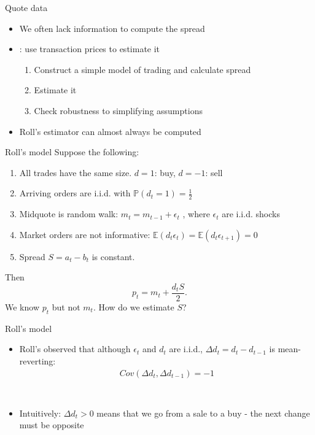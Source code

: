 \documentclass[english,10pt]{beamer}
\begin{document}
\begin{frame}{Quote data}
	\begin{itemize}
		\item We often lack information to compute the spread
		\item \citet{roll_simple_1984}: use transaction prices to estimate it
		\begin{enumerate}
			\item Construct a simple model of trading and calculate spread
			\item Estimate it
			\item Check robustness to simplifying assumptions
		\end{enumerate}
		\item Roll's estimator can almost always be computed
	\end{itemize}
\end{frame}


\begin{frame}{Roll's model}
	Suppose the following:
	\begin{enumerate}
		\item All trades have the same size. $d=1$: buy, $d=-1$: sell
		\item Arriving orders are i.i.d. with $\mathbb{P}(d_t =1)=\frac{1}{2}$
		\item Midquote is random walk: $m_t = m_{t-1} + \epsilon_t$  , where $\epsilon_t$ are i.i.d. shocks
		\item Market orders are not informative: $\mathbb{E}(d_t \epsilon_t)=\mathbb{E}(d_t \epsilon_{t+1})=0$
		\item Spread $S = a_t-b_t$ is constant.
	\end{enumerate}
	Then
	\[
	p_t = m_t + \frac{d_t S}{2}.
	\]
	We know $p_t$ but not $m_t$. How do we estimate $S$?
\end{frame}


\begin{frame}{Roll's model}
	\begin{itemize}
		\item Roll's observed that although $\epsilon_t$ and $d_t$ are i.i.d., $\Delta d_t = d_t - d_{t-1}$ is mean-reverting:
		\begin{align*}
		Cov(\Delta d_t, \Delta d_{t-1})	= -1
		\\
		\\
		\\
		\\
		\\
		\end{align*}
		\item Intuitively: $\Delta d_t>0$ means that we go from a sale to a buy - the next change must be opposite
	\end{itemize}
\end{frame}
\end{document}
